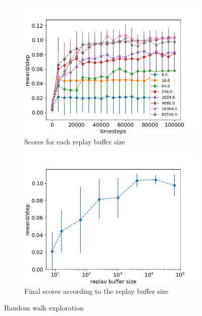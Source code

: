 \documentclass{article}
\begin{document}
\begin{figure}[H]
  \centering
    \begin{subfigure}[b]{0.45\linewidth}
    \includegraphics[width=\linewidth]{Study_1/1.2/curves1_2.png}
    \caption{Scores for each replay buffer size}
    \end{subfigure}
    \begin{subfigure}[b]{0.45\linewidth}
    \includegraphics[width=\linewidth]{Study_1/1.2/total_scores1_2.png}
    \caption{Final scores according to the replay buffer size}
    \end{subfigure}
    \caption{Random walk exploration}
  \label{fig:scores_random_walk}
\end{figure}
\end{document}
